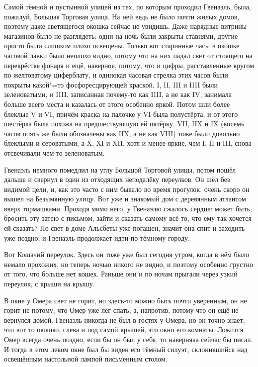 Самой тёмной и пустынной улицей из тех, по которым проходил Гвенаэль, была,
пожалуй, Большая Торговая улица.
На ней ведь не было почти жилых домов, поэтому даже светящегося окошка сейчас не
увидишь.
Даже нарядные витрины магазинов было не разглядеть: одни на ночь были закрыты
ставнями, другие просто были слишком плохо освещены.
Только вот старинные часы в окошке часовой лавки было неплохо видно, потому что
на них падал свет от стоящего на перекрёстке фонаря и ещё, наверное, потому, что
и цифры, расставленные кругом по желтоватому циферблату, и одинокая часовая
стрелка этих часов были покрыты какой"=то фосфоресцирующей краской.
I, II, III и IIII были зеленоватыми, и IIII, записанная почему-то как IIII, а не
как IV, занимала больше всего места и казалась от этого особенно яркой.
Потом шли более блеклые V и VI, причём краска на палочке у VI была полустёрта,
и от этого шестёрка была похожа на предшествующую ей пятёрку.
VII, IIX и IX (восемь часов опять же были обозначены как IIX, а не как VIII)
тоже были довольно блеклыми и сероватыми, а X, XI и XII, хотя и менее яркие, чем
I, II и III, снова отсвечивали чем-то зеленоватым.

Гвенаэль немного помедлил на углу Большой Торговой улицы, потом пошёл дальше и
свернул в один из отходящих неподалёку переулков.
Он шёл без видимой цели, и, как это часто с ним бывало во время прогулок, очень
скоро он вышел на Безымянную улицу.
Вот уже и знакомый дом с деревянным атлантом вверх тормашками.
Проходя мимо него, у Гвенаэлю сжалось сердце: может быть, бросить эту затею с
письмом, зайти и сказать самому всё то, что ему так хочется ей сказать?
Но свет в доме Альсбеты уже погашен, значит она спит и заходить уже поздно, и
Гвенаэль продолжает идти по тёмному городу.

Вот Кошачий переулок.
Здесь он тоже уже был сегодня утром, когда в нём было немало прохожих, но теперь
ночью никого не видно, и поэтому особенно грустно от того, что больше нет кошек.
Раньше они и по ночам прыгали через узкий переулок, с крыши на крышу.

В окне у Омера свет не горит, но здесь-то можно быть почти уверенным, он не
горит не потому, что Омер уже лёг спать, а, напротив, потому что он ещё не
вернулся домой.
Гвенаэль никогда не был в гостях у Омера, но он точно знает, что вот то окошко,
слева и под самой крышей, это окно его комнаты.
Ложится Омер всегда очень поздно, если бы он был у себя, то наверняка сейчас бы
писал.
И тогда в этом левом окне был бы виден его тёмный силуэт, склонившийся над
освещённым настольной лампой письменным столом.

